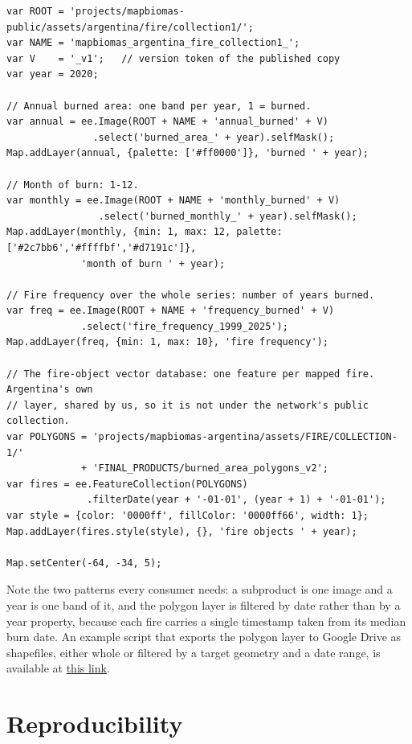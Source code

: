\documentclass[11pt,a4paper]{article}
\begin{document}
\begin{lstlisting}
var ROOT = 'projects/mapbiomas-public/assets/argentina/fire/collection1/';
var NAME = 'mapbiomas_argentina_fire_collection1_';
var V    = '_v1';   // version token of the published copy
var year = 2020;

// Annual burned area: one band per year, 1 = burned.
var annual = ee.Image(ROOT + NAME + 'annual_burned' + V)
               .select('burned_area_' + year).selfMask();
Map.addLayer(annual, {palette: ['#ff0000']}, 'burned ' + year);

// Month of burn: 1-12.
var monthly = ee.Image(ROOT + NAME + 'monthly_burned' + V)
                .select('burned_monthly_' + year).selfMask();
Map.addLayer(monthly, {min: 1, max: 12, palette: ['#2c7bb6','#ffffbf','#d7191c']},
             'month of burn ' + year);

// Fire frequency over the whole series: number of years burned.
var freq = ee.Image(ROOT + NAME + 'frequency_burned' + V)
             .select('fire_frequency_1999_2025');
Map.addLayer(freq, {min: 1, max: 10}, 'fire frequency');

// The fire-object vector database: one feature per mapped fire.  Argentina's own
// layer, shared by us, so it is not under the network's public collection.
var POLYGONS = 'projects/mapbiomas-argentina/assets/FIRE/COLLECTION-1/'
             + 'FINAL_PRODUCTS/burned_area_polygons_v2';
var fires = ee.FeatureCollection(POLYGONS)
              .filterDate(year + '-01-01', (year + 1) + '-01-01');
var style = {color: '0000ff', fillColor: '0000ff66', width: 1};
Map.addLayer(fires.style(style), {}, 'fire objects ' + year);

Map.setCenter(-64, -34, 5);
\end{lstlisting}

\noindent Note the two patterns every consumer needs: a subproduct is one image and a year is one
band of it, and the polygon layer is filtered by date rather than by a year property, because each
fire carries a single timestamp taken from its median burn date.
An example script that exports the polygon layer to Google Drive as shapefiles, either whole or
filtered by a target geometry and a date range, is available at
\href{https://code.earthengine.google.com/24b57ac2c403174d0c1417a01ad7a68b}{this link}.

\section{Reproducibility}
\end{document}
